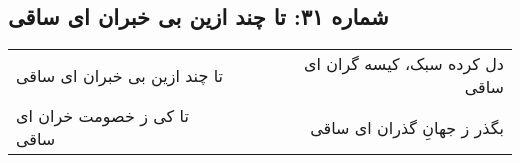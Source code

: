 \begin{center}
\section*{شماره ۳۱: تا چند ازین بی خبران ای ساقی}
\label{sec:031}
\begin{longtable}{l p{0.5cm} r}
تا چند ازین بی خبران ای ساقی
&&
دل کرده سبک، کیسه گران ای ساقی
\\
تا کی ز خصومت خران ای ساقی
&&
بگذر ز جهانِ گذران ای ساقی
\\
\end{longtable}
\end{center}
